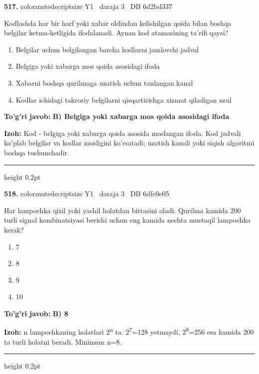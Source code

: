 \documentclass[10pt,a4paper,oneside]{article}
\begin{document}
\noindent\textbf{\color{ink}517.}  {color{muted}scriptsize Y1 \textbullet\ daraja 3 \textbullet\ DB 6d2bd337}
\par
Kodlashda har bir harf yoki xabar oldindan kelishilgan qoida bilan boshqa belgilar ketma-ketligida ifodalanadi. Aynan kod atamasining ta'rifi qaysi?
\begin{enumerate}[label=\Alph*),leftmargin=9mm]
\item Belgilar uchun belgilangan barcha kodlarni jamlovchi jadval
\item Belgiga yoki xabarga mos qoida asosidagi ifoda
\item Xabarni boshqa qurilmaga uzatish uchun tanlangan kanal
\item Kodlar ichidagi takroriy belgilarni qisqartirishga xizmat qiladigan usul
\end{enumerate}
\begin{tcolorbox}[enhanced,breakable,colback=teal!4,colframe=teal!50!black,boxrule=0.5pt,arc=1.1mm,left=3mm,right=3mm,top=1.7mm,bottom=1.7mm,before skip=2mm,after skip=2mm]
\textbf{\color{teal}To'g'ri javob:} \textbf{B) Belgiga yoki xabarga mos qoida asosidagi ifoda}
\par\smallskip
\textbf{Izoh:} Kod - belgiga yoki xabarga qoida asosida moslangan ifoda. Kod jadvali ko'plab belgilar va kodlar mosligini ko'rsatadi; uzatish kanali yoki siqish algoritmi boshqa tushunchadir.
\end{tcolorbox}
\vspace{2mm}\hrule height 0.2pt \vspace{3mm}

\noindent\textbf{\color{ink}518.}  {color{muted}scriptsize Y1 \textbullet\ daraja 3 \textbullet\ DB 6dfc0e05}
\par
Har lampochka qizil yoki yashil holatdan bittasini oladi. Qurilma kamida 200 turli signal kombinatsiyasi berishi uchun eng kamida nechta mustaqil lampochka kerak?
\begin{enumerate}[label=\Alph*),leftmargin=9mm]
\item 7
\item 8
\item 9
\item 10
\end{enumerate}
\begin{tcolorbox}[enhanced,breakable,colback=teal!4,colframe=teal!50!black,boxrule=0.5pt,arc=1.1mm,left=3mm,right=3mm,top=1.7mm,bottom=1.7mm,before skip=2mm,after skip=2mm]
\textbf{\color{teal}To'g'ri javob:} \textbf{B) 8}
\par\smallskip
\textbf{Izoh:} n lampochkaning holatlari 2\textsuperscript{n} ta. 2\textsuperscript{7}=128 yetmaydi, 2\textsuperscript{8}=256 esa kamida 200 ta turli holatni beradi. Minimum n=8.
\end{tcolorbox}
\vspace{2mm}\hrule height 0.2pt \vspace{3mm}
\end{document}
